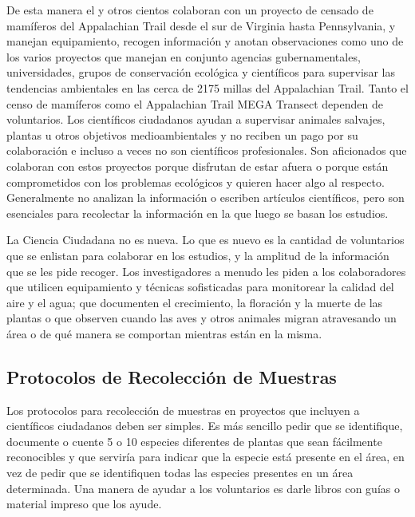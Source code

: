 	De esta manera el y otros cientos colaboran con un proyecto de censado de mamíferos del Appalachian Trail desde el sur de Virginia hasta Pennsylvania, y manejan equipamiento, recogen información y anotan observaciones como uno de los varios proyectos que manejan en conjunto agencias gubernamentales, universidades, grupos de conservación ecológica y científicos para supervisar las tendencias ambientales en las cerca de 2175 millas del Appalachian Trail. Tanto el censo de mamíferos como el Appalachian Trail MEGA Transect dependen de voluntarios. Los científicos ciudadanos ayudan a supervisar animales salvajes, plantas u otros objetivos medioambientales y no reciben un pago por su colaboración e incluso a veces no son científicos profesionales. Son aficionados que colaboran con estos proyectos porque disfrutan de estar afuera o porque están comprometidos con los problemas ecológicos y quieren hacer algo al respecto. Generalmente no analizan la información o escriben artículos científicos, pero son esenciales para recolectar la información en la que luego se basan los estudios. 
	
	La Ciencia Ciudadana no es nueva. Lo que es nuevo es la cantidad de voluntarios que se enlistan para colaborar en los estudios, y la amplitud de la información que se les pide recoger. Los investigadores a menudo les piden a los colaboradores que utilicen equipamiento y técnicas sofisticadas para monitorear la calidad del aire y el agua; que documenten el crecimiento, la floración y la muerte de las plantas o que observen cuando las aves y otros animales migran atravesando un área o de qué manera se comportan mientras están en la misma. 
	

\subsection{Protocolos de Recolección de Muestras}

	Los protocolos para recolección de muestras en proyectos que incluyen a científicos ciudadanos deben ser simples. Es más sencillo pedir que se identifique, documente o cuente 5 o 10 especies diferentes de plantas que sean fácilmente reconocibles y que serviría para indicar que la especie está presente en el área, en vez de pedir que se identifiquen todas las especies presentes en un área determinada. Una manera de ayudar a los voluntarios es darle libros con guías o material impreso que los ayude.
	
